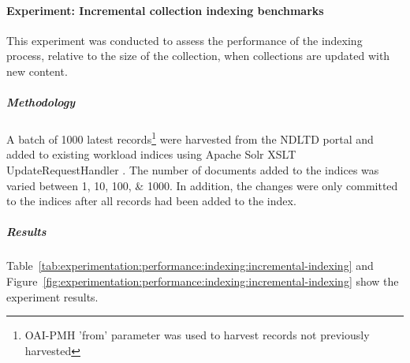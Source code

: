 \tablespacing

\bodyspacing

\paragraph{Experiment: Incremental collection indexing benchmarks}
\label{sec:evaluation:performance:indexing:experiment2}

This experiment was conducted to assess the performance of the indexing process, relative to the size of the collection, when collections are updated with new content.

\subparagraph{Methodology}

A batch of \num{1000} latest records\footnote{OAI-PMH 'from' parameter was used to harvest records not previously harvested} were harvested from the NDLTD portal and added to existing workload indices using Apache Solr XSLT UpdateRequestHandler \citep{SolrXSLTURH2012}. The number of documents added to the indices was varied between \numlist{1;10;100;1000}. In addition, the changes were only committed to the indices after all records had been added to the index.

\subparagraph{Results}

Table~\ref{tab:experimentation:performance:indexing:incremental-indexing} and Figure~\ref{fig:experimentation:performance:indexing:incremental-indexing} show the experiment results.

% 
\begin{comment}
\tablespacing

\bodyspacing
\end{comment}

